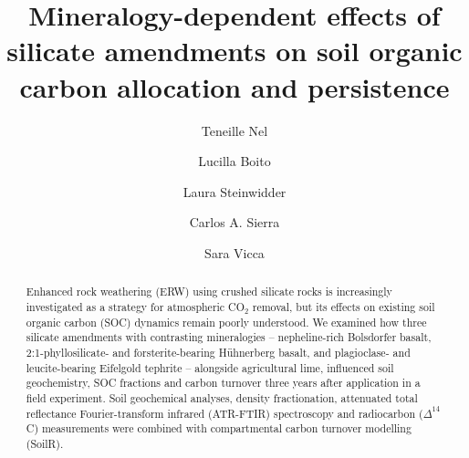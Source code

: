 \documentclass[preprint,12pt]{elsarticle}
\begin{document}
\linenumbers
\begin{frontmatter}

\title{Mineralogy-dependent effects of silicate amendments on soil organic carbon allocation and persistence}

\author[aff1]{Teneille Nel}

\author[aff1]{Lucilla Boito}

\author[aff1]{Laura Steinwidder}

\author[aff2]{Carlos A. Sierra}

\author[aff1]{Sara Vicca}

\address[aff1]{
    Department of Bioscience Engineering,
    University of Antwerp,
    Antwerp,
    Belgium
}

\address[aff2]{
    Theoretical Ecosystem Ecology Research Group,
    Max Planck Institute for Biogeochemistry,
    Jena,
    Germany
}


\begin{abstract}

Enhanced rock weathering (ERW) using crushed silicate rocks is increasingly investigated as a strategy for atmospheric CO$_2$ removal, but its effects on existing soil organic carbon (SOC) dynamics remain poorly understood. We examined how three silicate amendments with contrasting mineralogies – nepheline-rich Bolsdorfer basalt, 2:1-phyllosilicate- and forsterite-bearing H\"uhnerberg basalt, and plagioclase- and leucite-bearing Eifelgold tephrite – alongside agricultural lime, influenced soil geochemistry, SOC fractions and carbon turnover three years after application in a field experiment. Soil geochemical analyses, density fractionation, attenuated total reflectance Fourier-transform infrared (ATR-FTIR) spectroscopy and radiocarbon ($\Delta^{14}$C) measurements were combined with compartmental carbon turnover modelling (SoilR).


\end{abstract}
\end{frontmatter}
\end{document}
